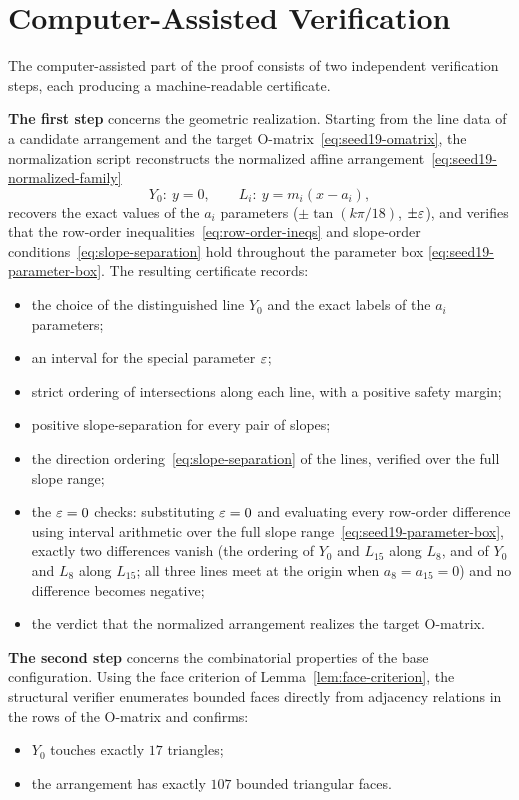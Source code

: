 \section{Computer-Assisted Verification}\label{sec:certified-package}

The computer-assisted part of the proof consists of two independent
verification steps, each producing a machine-readable certificate.

\textbf{The first step} concerns the geometric realization. Starting from the
line data of a candidate arrangement and the target $\mathrm{O}$-matrix~\eqref{eq:seed19-omatrix},
the normalization script reconstructs the normalized affine
arrangement~\eqref{eq:seed19-normalized-family}
\[
  Y_0:\ y=0,
  \qquad
  L_i:\ y=m_i(x-a_i),
\]
recovers the exact values of the $a_i$ parameters
($\pm\tan(k\pi/18)$, $\pm\varepsilon$), and verifies that the row-order
inequalities~\eqref{eq:row-order-ineqs} and slope-order
conditions~\eqref{eq:slope-separation} hold throughout the
parameter box \eqref{eq:seed19-parameter-box}. The resulting certificate
records:
\begin{itemize}[label=$\triangleright$]
\item the choice of the distinguished line $Y_0$ and the exact labels of the
  $a_i$ parameters;
\item an interval for the special parameter $\varepsilon$;
\item strict ordering of intersections along each line, with a positive
  safety margin;
\item positive slope-separation for every pair of slopes;
\item the direction ordering~\eqref{eq:slope-separation} of the lines,
  verified over the full slope range;
\item the $\varepsilon=0$ checks: substituting $\varepsilon=0$ and evaluating every
  row-order difference using interval arithmetic over the full slope
  range~\eqref{eq:seed19-parameter-box}, exactly two differences vanish
  (the ordering of $Y_0$ and $L_{15}$ along $L_8$, and of $Y_0$ and $L_8$
  along $L_{15}$; all three lines meet at the origin when $a_8=a_{15}=0$)
  and no difference becomes negative;
\item the verdict that the normalized arrangement realizes the target
  $\mathrm{O}$-matrix.
\end{itemize}

\textbf{The second step} concerns the combinatorial properties of the base
configuration. Using the face criterion of Lemma~\ref{lem:face-criterion},
the structural verifier enumerates bounded faces directly from adjacency
relations in the rows of the $\mathrm{O}$-matrix and confirms:
\begin{itemize}[label=$\triangleright$]
\item $Y_0$ touches exactly $17$ triangles;
\item the arrangement has exactly $107$ bounded triangular faces.
\end{itemize}

